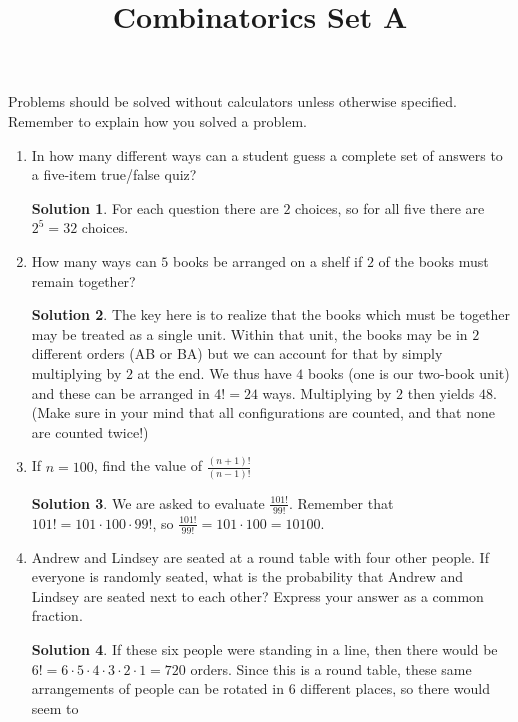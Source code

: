 \documentclass{article}
\title{Combinatorics Set A}
\author{}
\date{}
\theoremstyle{definition}
\newtheorem*{solution}{Solution}
\begin{document}
    \maketitle
    \noindent Problems should be solved without calculators unless otherwise specified.
    Remember to explain how you solved a problem.
    \begin{enumerate}
        \item In how many different ways can a student guess a complete set of answers to a
        five-item true/false quiz?
        \begin{solution}
            For each question there are $2$ choices, so for all five there are $2^5 = 32$ choices.
        \end{solution}
        \item How many ways can $5$ books be arranged on a shelf if $2$ of the books must
        remain together?
        \begin{solution}
            The key here is to realize that the books which must be together may be treated as a
            single unit. Within that unit, the books may be in $2$ different orders (AB or BA) but
            we can account for that by simply multiplying by $2$ at the end. We thus have $4$ books
            (one is our two-book unit) and these can be arranged in $4! = 24$ ways. Multiplying by
            $2$ then yields $48$. (Make sure in your mind that all configurations are counted, and
            that none are counted twice!)
        \end{solution}
        \item If $n = 100$, find the value of $\frac{(n+1)!}{(n-1)!}$
        \begin{solution}
            We are asked to evaluate $\frac{101!}{99!}$. Remember that $101! = 101 \cdot 100 \cdot
            99!$, so $\frac{101!}{99!} = 101 \cdot 100 = 10100$.
        \end{solution}
        \item Andrew and Lindsey are seated at a round table with four other people. If everyone
        is randomly seated, what is the probability that Andrew and Lindsey are seated next to
        each other? Express your answer as a common fraction.
        \begin{solution}
            If these six people were standing in a line, then there would be $6! = 6 \cdot 5 \cdot
            4 \cdot 3 \cdot 2 \cdot 1 = 720$ orders. Since this is a round table, these same
            arrangements of people can be rotated in $6$ different places, so there would seem to

\end{solution}
\end{enumerate}
\end{document}
